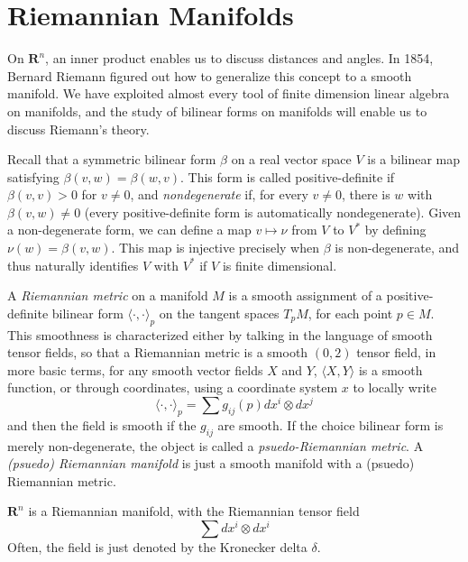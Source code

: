 \chapter{Riemannian Manifolds}

On $\mathbf{R}^n$, an inner product enables us to discuss distances and angles. In 1854, Bernard Riemann figured out how to generalize this concept to a smooth manifold. We have exploited almost every tool of finite dimension linear algebra on manifolds, and the study of bilinear forms on manifolds will enable us to discuss Riemann's theory.

Recall that a symmetric bilinear form $\beta$ on a real vector space $V$ is a bilinear map satisfying $\beta(v,w) = \beta(w,v)$. This form is called positive-definite if $\beta(v,v) > 0$ for $v \neq 0$, and {\it nondegenerate} if, for every $v \neq 0$, there is $w$ with $\beta(v,w) \neq 0$ (every positive-definite form is automatically nondegenerate). Given a non-degenerate form, we can define a map $v \mapsto \nu$ from $V$ to $V^*$ by defining $\nu(w) = \beta(v,w)$. This map is injective precisely when $\beta$ is non-degenerate, and thus naturally identifies $V$ with $V^*$ if $V$ is finite dimensional.

A \emph{Riemannian metric} on a manifold $M$ is a smooth assignment of a positive-definite bilinear form $\langle \cdot, \cdot \rangle_p$ on the tangent spaces $T_p M$, for each point $p \in M$. This smoothness is characterized either by talking in the language of smooth tensor fields, so that a Riemannian metric is a smooth $(0,2)$ tensor field, in more basic terms, for any smooth vector fields $X$ and $Y$, $\langle X, Y \rangle$ is a smooth function, or through coordinates, using a coordinate system $x$ to locally write
%
\[ \langle \cdot, \cdot \rangle_p = \sum g_{ij}(p) dx^i \otimes dx^j \]
%
and then the field is smooth if the $g_{ij}$ are smooth. If the choice bilinear form is merely non-degenerate, the object is called a \emph{psuedo-Riemannian metric}. A \emph{(psuedo) Riemannian manifold} is just a smooth manifold with a (psuedo) Riemannian metric.

\begin{example}
    $\mathbf{R}^n$ is a Riemannian manifold, with the Riemannian tensor field
    \[ \sum dx^i \otimes dx^i \]
    Often, the field is just denoted by the Kronecker delta $\delta$.
\end{example}

